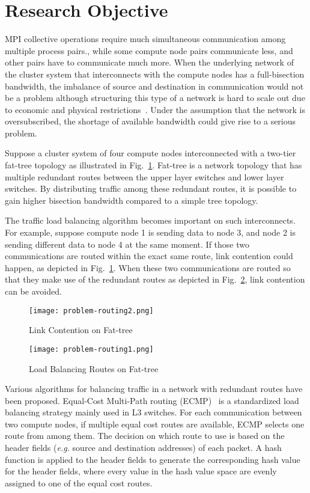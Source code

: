 \section{Research Objective}\label{sec:iii-background}

MPI collective operations require much simultaneous communication among
multiple process pairs., while some compute node pairs communicate less, and
other pairs have to communicate much more. When the underlying network of the
cluster system that interconnects with the compute nodes has a full-bisection
bandwidth, the imbalance of source and destination in communication would not
be a problem although structuring this type of a network is hard to scale out
due to economic and physical restrictions~\autocite{Al-Fares2008}. Under the
assumption that the network is oversubscribed, the shortage of available
bandwidth could give rise to a serious problem.

Suppose a cluster system of four compute nodes interconnected with a
two-tier fat-tree topology as illustrated in Fig.~\ref{fig:problem-routing1}.
Fat-tree is a network topology that has multiple redundant routes between the
upper layer switches and lower layer switches. By distributing traffic among
these redundant routes, it is possible to gain higher bisection bandwidth
compared to a simple tree topology.

The traffic load balancing algorithm becomes important on such interconnects.
For example, suppose
compute node 1 is sending data to node 3, and node 2 is sending
different data to node 4 at the same moment. If those two communications
are routed within the exact same route, link contention could happen, as
depicted in Fig.~\ref{fig:problem-routing1}. When these two
communications are routed so that they make use of the redundant routes
as depicted in Fig.~\ref{fig:problem-routing2}, link contention can be
avoided.

\begin{figure}
    \centering
    \texttt{[image: problem-routing2.png]}
    \caption{Link Contention on Fat-tree}%
    \label{fig:problem-routing1}
\end{figure}

\begin{figure}
    \centering
    \texttt{[image: problem-routing1.png]}
    \caption{Load Balancing Routes on Fat-tree}%
    \label{fig:problem-routing2}
\end{figure}

Various algorithms for balancing traffic in a network with redundant
routes have been proposed. Equal-Cost Multi-Path routing (ECMP)~\autocite{ecmp} is
a standardized load balancing strategy mainly used in L3 switches. For each
communication between two compute nodes, if multiple equal cost routes are
available, ECMP selects one route from among them. The decision on which route
to use is based on the header fields (\emph{e.g.} source and destination
addresses) of each packet. A hash function is applied to the header fields to
generate the corresponding hash value for the header fields, where every value
in the hash value space are evenly assigned to one of the equal cost routes.

